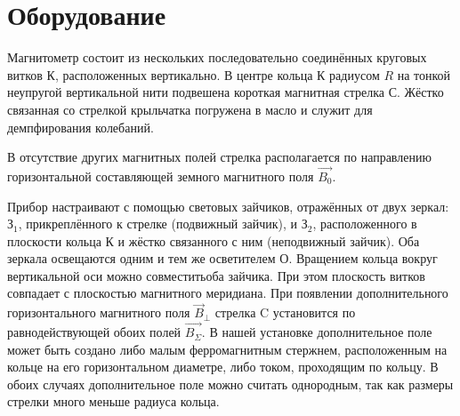 \section{Оборудование}
\begin{figure}[ht!]
\end{figure}
Магнитометр состоит из нескольких последовательно соединённых круговых витков К, расположенных вертикально. В центре кольца К радиусом $R$ на тонкой неупругой вертикальной нити подвешена короткая магнитная стрелка С.  Жёстко связанная со стрелкой крыльчатка погружена в масло и служит для демпфирования колебаний.

\begin{figure}[ht!]
\end{figure}

В отсутствие других магнитных полей стрелка располагается по направлению горизонтальной составляющей земного магнитного поля $\vec{B_{0}}$. 

Прибор настраивают с помощью световых зайчиков, отражённых от двух зеркал: $\text{З}_{1}$, прикреплённого к стрелке (подвижный зайчик), и $\text{З}_{2}$, расположенного в плоскости кольца К и жёстко связанного с ним (неподвижный зайчик). Оба зеркала освещаются одним и тем же осветителем О. Вращением кольца вокруг вертикальной оси можно совместитьоба зайчика. При этом плоскость витков совпадает с плоскостью магнитного меридиана. При появлении дополнительного горизонтального магнитного поля $\vec{B}_{\bot}$ стрелка C установится по равнодействующей обоих полей $\vec{B_{ \Sigma}}$. В нашей установке дополнительное поле может быть создано либо малым ферромагнитным стержнем, расположенным на кольце на его горизонтальном диаметре, либо током, проходящим по кольцу.  В обоих случаях дополнительное поле можно считать однородным, так как размеры стрелки много меньше радиуса кольца.

